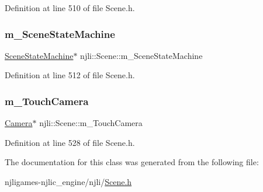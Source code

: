 Definition at line 510 of file Scene.\+h.

\mbox{\label{classnjli_1_1_scene_af74cab422e8f225410580c3094a621ab}} 
\subsubsection{\texorpdfstring{m\+\_\+\+Scene\+State\+Machine}{m\_SceneStateMachine}}
{\footnotesize\ttfamily \mbox{\hyperlink{classnjli_1_1_scene_state_machine}{Scene\+State\+Machine}}$\ast$ njli\+::\+Scene\+::m\+\_\+\+Scene\+State\+Machine\hspace{0.3cm}{\ttfamily [private]}}



Definition at line 512 of file Scene.\+h.

\mbox{\label{classnjli_1_1_scene_ad530ff8622354101eb23d43982a2fea9}} 
\subsubsection{\texorpdfstring{m\+\_\+\+Touch\+Camera}{m\_TouchCamera}}
{\footnotesize\ttfamily \mbox{\hyperlink{classnjli_1_1_camera}{Camera}}$\ast$ njli\+::\+Scene\+::m\+\_\+\+Touch\+Camera\hspace{0.3cm}{\ttfamily [private]}}



Definition at line 528 of file Scene.\+h.



The documentation for this class was generated from the following file\+:\begin{DoxyCompactItemize}
\item 
njligames-\/njlic\+\_\+engine/njli/\mbox{\hyperlink{_scene_8h}{Scene.\+h}}\end{DoxyCompactItemize}
